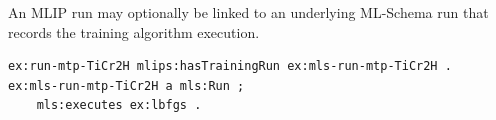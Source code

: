 An MLIP run may optionally be linked to an underlying ML-Schema run that records the training algorithm execution.
\begin{lstlisting}[language=turtle]
ex:run-mtp-TiCr2H mlips:hasTrainingRun ex:mls-run-mtp-TiCr2H .
ex:mls-run-mtp-TiCr2H a mls:Run ;
    mls:executes ex:lbfgs .
\end{lstlisting}
